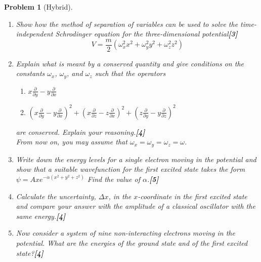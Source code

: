\documentclass[a4paper]{article}
\theoremstyle{new}
\newtheorem{qns}{Problem}[subsection]
\begin{document}
\begin{qns}[Hybrid]\leavevmode
\begin{enumerate}[label=(\alph*)]
\item Show how the method of separation of variables can be used to solve the time-independent Schrodinger equation for the three-dimensional potential\hfill\textbf{[3]}
$$V=\frac{m}{2}(\omega_x^2x^2+\omega_y^2y^2+\omega_z^2z^2)$$
\item Explain what is meant by a conserved quantity and give conditions on the constants $\omega_x$, $\omega_y$, and $\omega_z$ such that the operators
\begin{enumerate}[label=(\roman*)]
\item $x\frac{\partial}{\partial y}-y\frac{\partial}{\partial x}$
\item $(x\frac{\partial}{\partial y}-y\frac{\partial}{\partial x})^2+(x\frac{\partial}{\partial z}-z\frac{\partial}{\partial x})^2+(z\frac{\partial}{\partial y}-y\frac{\partial}{\partial z})^2$
\end{enumerate}
are conserved. Explain your reasoning.\hfill\textbf{[4]}\\[5pt]
From now on, you may assume that $\omega_x=\omega_y=\omega_z=\omega$.
\item Write down the energy levels for a single electron moving in the potential and show that a suitable wavefunction for the first excited state takes the form $\psi=Axe^{-\alpha(x^2+y^2+z^2)}$ Find the value of $\alpha$.\hfill\textbf{[5]}
\item Calculate the uncertainty, $\Delta x$, in the $x$-coordinate in the first excited state and compare your answer with the amplitude of a classical oscillator with the same energy.\hfill\textbf{[4]}
\begin{mdframed}
\end{mdframed}
\item Now consider a system of nine non-interacting electrons moving in the potential. What are the energies of the ground state and of the first excited state?\hfill\textbf{[4]}
\end{enumerate}
\end{qns}
\end{document}
